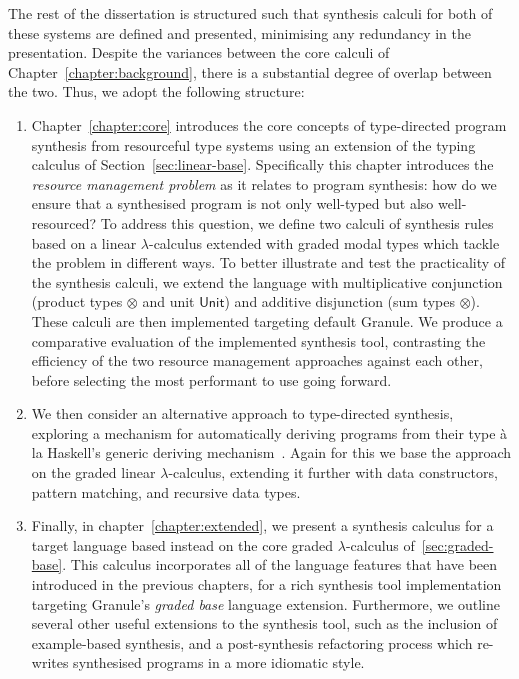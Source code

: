 The rest of the dissertation is structured such that synthesis calculi for both
of these systems are defined and presented, minimising any redundancy in the
presentation. Despite the variances between the core calculi
of Chapter~\ref{chapter:background}, there is a substantial degree of overlap between
the two. Thus, we adopt the following structure: 
\begin{enumerate}
        \item Chapter~\ref{chapter:core} introduces the core concepts of
        type-directed program synthesis from resourceful type systems using an
        extension of the typing calculus of Section~\ref{sec:linear-base}.
        Specifically this chapter introduces the \textit{resource management
        problem} as it relates to program synthesis: how do we ensure that a
        synthesised program is not only well-typed but also well-resourced? To
        address this question, we define two calculi of synthesis rules based on
        a linear $\lambda$-calculus extended with graded modal types which
        tackle the problem in different ways. To better illustrate and test the
        practicality of the synthesis calculi, we extend the language with
        multiplicative conjunction (product types $\otimes$ and unit $\mathsf{Unit}$) and
        additive disjunction (sum types $\otimes$). These calculi are then
        implemented targeting default Granule. We produce a comparative
        evaluation of the implemented synthesis tool, contrasting the efficiency
        of the two resource management approaches against each other, before
        selecting the most performant to use going forward.  

        \item We then consider an alternative approach to type-directed synthesis,
        exploring a mechanism for automatically deriving programs from their
        type à la Haskell's generic deriving mechanism~\citep{generic-deriving}.
        Again for this we base the approach on the graded linear
        $\lambda$-calculus, extending it further with data constructors, pattern
        matching, and recursive data types.
        \item Finally, in chapter~\ref{chapter:extended}, we present a synthesis
        calculus for a target language based instead on the core graded
        $\lambda$-calculus of~\ref{sec:graded-base}. This calculus incorporates
        all of the language features that have been introduced in the previous chapters,
        for a rich synthesis tool implementation targeting Granule's
        \emph{graded base} language extension. Furthermore, we outline several other useful 
        extensions to the synthesis tool, such as the inclusion of example-based synthesis,
        and a post-synthesis refactoring process which re-writes synthesised programs in 
        a more idiomatic style.


\end{enumerate}
